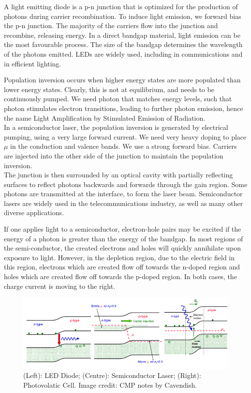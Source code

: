 \documentclass[a4paper]{article}
\begin{document}
\begin{Note}
A light emitting diode is a p-n junction that is optimized for the production of photons during carrier recombination. To induce light emission, we forward bias the p-n junction. The majority of the carriers flow into the junction and recombine, releasing energy. In a direct bandgap material, light emission can be the most favourable process. The size of the bandgap determines the wavelength of the photons emitted. LEDs are widely used, including in communications and in efficient lighting. 
\end{Note}
\begin{Note}
Population inversion occurs when higher energy states are more populated than lower energy states. Clearly, this is not at equilibrium, and needs to be continuously pumped. We need photon that matches energy levels, such that photon stimulates electron transitions, leading to further photon emission, hence the name Light Amplification by Stimulated Emission of Radiation.\\[5pt]
In a semiconductor laser, the population inversion is generated by electrical pumping, using a very large forward current. We need very heavy doping to place $\mu$ in the conduction and valence bands. We use a strong forward bias. Carriers are injected into the other side of the junction to maintain the population inversion.\\[5pt]
The junction is then surrounded by an optical cavity with partially reflecting surfaces to reflect photons backwards and forwards through the gain region. Some photons are transmitted at the interface, to form the laser beam. Semiconductor lasers are widely used in the telecommunications industry, as well as many other diverse applications.
\end{Note}
\begin{Note}
If one applies light to a semiconductor, electron-hole pairs may be excited if the energy of a photon is greater than the energy of the bandgap. In most regions of the semi-conductor, the created electrons and holes will quickly annihilate upon exposure to light. However, in the depletion region, due to the electric field in this region, electrons which are created flow off towards the n-doped region and holes which are created flow off towards the p-doped region. In both cases, the charge current is moving to the right.
\end{Note}
\begin{figure}[H]
    \centering
    \includegraphics[width=\linewidth]{semicon3.PNG}
    \caption{(Left): LED Diode; (Centre): Semiconductor Laser; (Right): Photovolatic Cell. Image credit: CMP notes by Cavendish.}
\end{figure}


\end{document}
